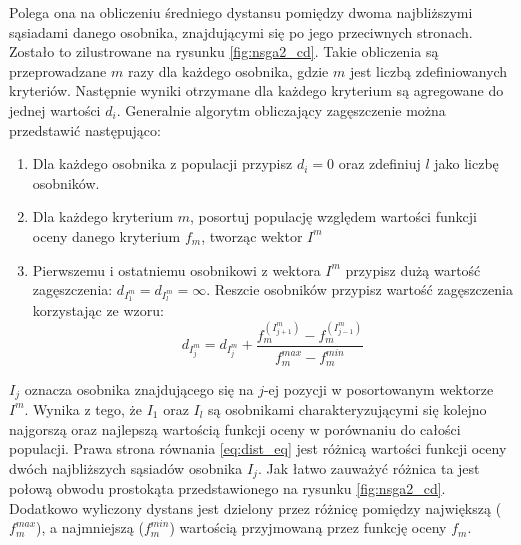 \documentclass[twoside]{iisthesis}
\begin{document}
Polega ona na obliczeniu średniego dystansu pomiędzy dwoma najbliższymi sąsiadami danego osobnika, znajdującymi się po jego przeciwnych stronach. Zostało to zilustrowane na rysunku \eqref{fig:nsga2_cd}. Takie obliczenia są przeprowadzane $m$ razy dla każdego osobnika, gdzie $m$ jest liczbą zdefiniowanych kryteriów. Następnie wyniki otrzymane dla każdego kryterium są agregowane do jednej wartości $d_{i}$. Generalnie algorytm obliczający zagęszczenie można przedstawić następująco:\\
\begin{enumerate}
	\item Dla każdego osobnika z populacji przypisz $d_{i} = 0$ oraz zdefiniuj $l$ jako liczbę osobników.
	\item Dla każdego kryterium $m$, posortuj populację względem wartości funkcji oceny danego kryterium $f_{m}$, tworząc wektor $I^{m}$
	\item Pierwszemu i ostatniemu osobnikowi z wektora $I^{m}$ przypisz dużą wartość zagęszczenia: $d_{I^{m}_{1}} = d_{I^{m}_{l}} = \infty$. Reszcie osobników przypisz wartość zagęszczenia korzystając ze wzoru:
	\begin{equation}\label{eq:dist_eq}
		d_{I^{m}_{j}} = d_{I^{m}_{j}} + \dfrac{f_{m}^{(I^{m}_{j+1})} - f_{m}^{(I^{m}_{j-1})}}{f^{max}_{m} - f^{min}_{m}}
	\end{equation}
\end{enumerate}
$I_{j}$ oznacza osobnika znajdującego się na $j$-ej pozycji w posortowanym wektorze $I^{m}$. Wynika z tego, że $I_{1}$ oraz $I_{l}$ są osobnikami charakteryzującymi się kolejno najgorszą oraz najlepszą wartością funkcji oceny w porównaniu do całości populacji. Prawa strona równania \eqref{eq:dist_eq} jest różnicą wartości funkcji oceny dwóch najbliższych sąsiadów osobnika $I_{j}$. Jak łatwo zauważyć różnica ta jest połową obwodu prostokąta przedstawionego na rysunku \eqref{fig:nsga2_cd}. Dodatkowo wyliczony dystans jest dzielony przez różnicę pomiędzy największą ($f^{max}_{m}$), a najmniejszą ($f^{min}_{m}$) wartością przyjmowaną przez funkcję oceny $f_{m}$. 
\end{document}
